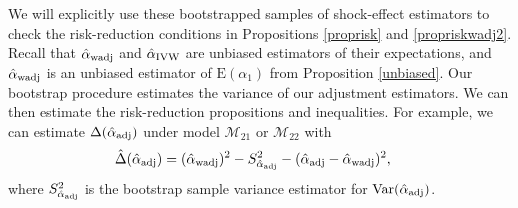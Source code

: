 \documentclass[11pt]{article}
\def\mc#1{\mathcal{#1}} %
\DeclareMathOperator*{\argmax}{arg\,max} %
\def\E#1{\mathrm{E}(#1)} %
\def\var#1{\mathrm{Var}(#1)} %
\DeclareMathOperator{\Var}{Var} %
\theoremstyle{definition}
\begin{document}
We will explicitly use these bootstrapped samples of shock-effect estimators to check the risk-reduction conditions in Propositions \ref{proprisk} and \ref{propriskwadj2}. Recall that  $\hat{\alpha}_{\rm wadj}$ and $\hat{\alpha}_{\rm IVW}$ are unbiased estimators of their expectations, and $\hat{\alpha}_{\rm wadj}$ is an unbiased estimator of $\E{\alpha_1}$ from Proposition \ref{unbiased}. Our bootstrap procedure estimates the variance of our adjustment estimators. We can then estimate the risk-reduction propositions and inequalities. For example, we can estimate $\Delta(\hat{\alpha}_{\rm adj})$ under model $\mc{M}_{21}$ or $\mc{M}_{22}$ with 
\begin{align*}
  \hat{\Delta}(\hat{\alpha}_{\rm adj}) & = (\hat{\alpha}_{\rm wadj})^2 -S^2_{\hat{\alpha}_{\rm adj}} -(\hat{\alpha}_{\rm adj}-\hat{\alpha}_{\rm wadj})^2,
\end{align*}
where $S^2_{\hat{\alpha}_{\rm adj}}$ is the bootstrap sample variance estimator for $\Var(\hat{\alpha}_{\rm adj})$. 

\end{document}
